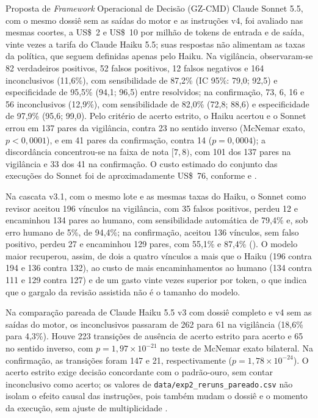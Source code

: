 \begin{chapter}{Proposta de \textit{Framework} Operacional de Decisão (GZ-CMD)}
Claude Sonnet 5.5, com o mesmo dossiê sem as saídas do motor e as instruções v4, foi avaliado nas mesmas coortes, a US\$~2 e US\$~10 por milhão de tokens de entrada e de saída, vinte vezes a tarifa do Claude Haiku 5.5; suas respostas não alimentam as taxas da política, que seguem definidas apenas pelo Haiku. Na vigilância, observaram-se 82 verdadeiros positivos, 52 falsos positivos, 12 falsos negativos e 164 inconclusivos (11,6\%), com sensibilidade de 87,2\% (IC 95\%: 79,0; 92,5) e especificidade de 95,5\% (94,1; 96,5) entre resolvidos; na confirmação, 73, 6, 16 e 56 inconclusivos (12,9\%), com sensibilidade de 82,0\% (72,8; 88,6) e especificidade de 97,9\% (95,6; 99,0). Pelo critério de acerto estrito, o Haiku acertou e o Sonnet errou em 137 pares da vigilância, contra 23 no sentido inverso (McNemar exato, $p<0{,}0001$), e em 41 pares da confirmação, contra 14 ($p=0{,}0004$); a discordância concentrou-se na faixa de nota $[7,8)$, com 101 dos 137 pares na vigilância e 33 dos 41 na confirmação. O custo estimado do conjunto das execuções do Sonnet foi de aproximadamente US\$~76, conforme  e  \cite{Jardim2026phdrepo}.

Na cascata v3.1, com o mesmo lote e as mesmas taxas do Haiku, o Sonnet como revisor aceitou 196 vínculos na vigilância, com 35 falsos positivos, perdeu 12 e encaminhou 134 pares ao humano, com sensibilidade automática de 79,4\% e, sob erro humano de 5\%, de 94,4\%; na confirmação, aceitou 136 vínculos, sem falso positivo, perdeu 27 e encaminhou 129 pares, com 55,1\% e 87,4\% (). O modelo maior recuperou, assim, de dois a quatro vínculos a mais que o Haiku (196 contra 194 e 136 contra 132), ao custo de mais encaminhamentos ao humano (134 contra 111 e 129 contra 127) e de um gasto vinte vezes superior por token, o que indica que o gargalo da revisão assistida não é o tamanho do modelo.

Na comparação pareada de Claude Haiku 5.5 v3 com dossiê completo e v4 sem as saídas do motor, os inconclusivos passaram de 262 para 61 na vigilância (18,6\% para 4,3\%). Houve 223 transições de ausência de acerto estrito para acerto e 65 no sentido inverso, com $p=1{,}97\times10^{-21}$ no teste de McNemar exato bilateral. Na confirmação, as transições foram 147 e 21, respectivamente ($p=1{,}78\times10^{-24}$). O acerto estrito exige decisão concordante com o padrão-ouro, sem contar inconclusivo como acerto; os valores de \texttt{data/exp2\_reruns\_pareado.csv} não isolam o efeito causal das instruções, pois também mudam o dossiê e o momento da execução, sem ajuste de multiplicidade \cite{Jardim2026phdrepo}.


\end{chapter}
